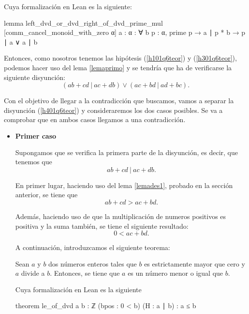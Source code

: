\begin{demostracion}
  Cuya formalización en Lean es la siguiente:
  \begin{leancode}
  lemma left_dvd_or_dvd_right_of_dvd_prime_mul
  [comm_cancel_monoid_with_zero α] {a : α} :
  ∀ {b p : α}, prime p → a ∣ p * b → p ∣ a ∨ a ∣ b
  \end{leancode}

  Entonces, como nosotros tenemos las hipótesis (\ref{h101q6teor}) y
  (\ref{h301q6teor}), podemos hacer uso del lema \ref{lemaprimo} y se tendría
  que ha de verificarse la siguiente disyunción:
  \begin{equation}\tag{h4}\label{h401q6teor}
    (ab+cd\ |\ ac+db) \lor (ac+bd\ |\ ad+bc).
  \end{equation}

  Con el objetivo de llegar a la contradicción que buscamos, vamos a separar
  la disyunción (\ref{h401q6teor}) y consideraremos los dos casos posibles.
  Se va a comprobar que en ambos casos llegamos a una contradicción.
  \begin{itemize}
  \item \textbf{Primer caso}

    Supongamos que se verifica la primera parte de la disyunción, es decir,
    que tenemos que
    \begin{equation}\tag{hj}\label{hj01q6teor}
      ab+cd\ |\ ac+db.
    \end{equation}

    En primer lugar, haciendo uso del lema \ref{lemades1}, probado en la
    sección anterior, se tiene que
    \begin{equation}\tag{hj1}\label{hj101q6}
      ab+cd > ac+bd.
    \end{equation}

    Además, haciendo uso de que la multiplicación de numeros positivos es
    positiva y la suma también, se tiene el siguiente resultado:
    \begin{equation}\label{hpj01q6}\tag{hpj}
      0 < ac+bd.
    \end{equation}

    A continuación, introduzcamos el siguiente teorema:
    \begin{teorema}\label{teoremaleq}
      Sean \(a\) y \(b\) dos números enteros tales que \(b\) es
      estrictamente mayor que cero y \(a\) divide a \(b\). Entonces, se
      tiene que \(a\) es un número menor o igual que
      \(b\).
    \end{teorema}

    Cuya formalización en Lean es la siguiente
    \begin{leancode}
    theorem le_of_dvd {a b : ℤ}
    (bpos : 0 < b)
    (H : a ∣ b) :
    a ≤ b
    \end{leancode}


\end{itemize}
\end{demostracion}

